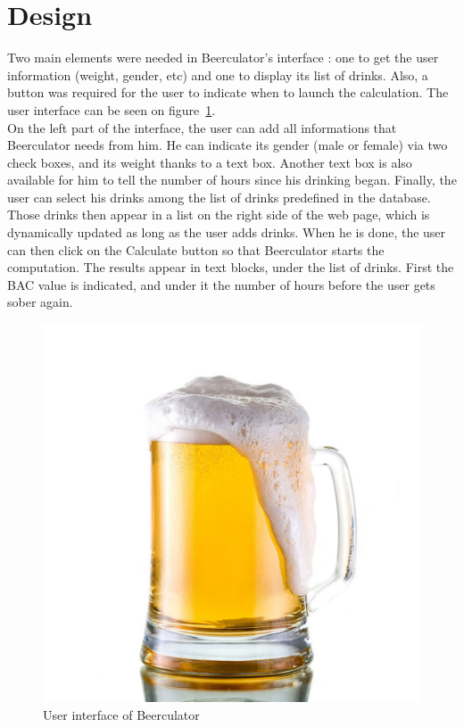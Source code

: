 \section{Design}
\label{sec:design}

Two main elements were needed in Beerculator's interface : one to get the user information (weight, gender, etc) and one to display its list of drinks. Also, a button was required for the user to indicate when to launch the calculation. The user interface can be seen on {\sc figure}~\ref{fig:ui}.\\

On the left part of the interface, the user can add all informations that Beerculator needs from him. He can indicate its gender (male or female) via two check boxes, and its weight thanks to a text box. Another text box is also available for him to tell the number of hours since his drinking began. Finally, the user can select his drinks among the list of drinks predefined in the database. \\

Those drinks then appear in a list on the right side of the web page, which is dynamically updated as long as the user adds drinks. When he is done, the user can then click on the \guillemotleft Calculate \guillemotright button so that Beerculator starts the computation. The results appear in text blocks, under the list of drinks. First the BAC value is indicated, and under it the number of hours before the user gets sober again.\\

\begin{figure}[H]
\centering
   \includegraphics[scale=0.3]{./figures/beer.jpg}
   \caption{User interface of Beerculator}
   \label{fig:ui}
\end{figure}